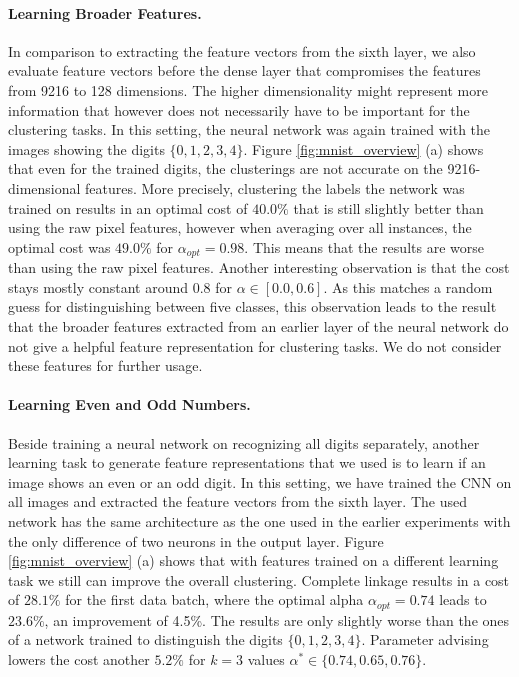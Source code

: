 \paragraph{Learning Broader Features.} In comparison to extracting the feature vectors from the sixth layer, we also evaluate feature vectors before the dense layer that compromises the features from 9216 to 128 dimensions. The higher dimensionality might represent more information that however does not necessarily have to be important for the clustering tasks. In this setting, the neural network was again trained with the images showing the digits $\{0,1,2,3,4\}$. Figure \ref{fig:mnist_overview} (a) shows that even for the trained digits, the clusterings are not accurate on the 9216-dimensional features. More precisely, clustering the labels the network was trained on results in an optimal cost of $40.0\%$ that is still slightly better than using the raw pixel features, however when averaging over all instances, the optimal cost was $49.0\%$ for $\alpha_{opt} = 0.98$. This means that the results are worse than using the raw pixel features. Another interesting observation is that the cost stays mostly constant around $0.8$ for $\alpha \in [0.0,0.6]$. As this matches a random guess for distinguishing between five classes, this observation leads to the result that the broader features extracted from an earlier layer of the neural network do not give a helpful feature representation for clustering tasks. We do not consider these features for further usage.

\paragraph{Learning Even and Odd Numbers.} Beside training a neural network on recognizing all digits separately, another learning task to generate feature representations that we used is to learn if an image shows an even or an odd digit. In this setting, we have trained the CNN on all images and extracted the feature vectors from the sixth layer. The used network has the same architecture as the one used in the earlier experiments with the only difference of two neurons in the output layer. Figure \ref{fig:mnist_overview} (a) shows that with features trained on a different learning task we still can improve the overall clustering. Complete linkage results in a cost of $28.1\%$ for the first data batch, where the optimal alpha $\alpha_{opt} = 0.74$ leads to $23.6\%$, an improvement of 4.5\%. The results are only slightly worse than the ones of a network trained to distinguish the digits $\{0,1,2,3,4\}$. Parameter advising lowers the cost another $5.2\%$ for $k = 3$ values $\alpha^* \in \{0.74, 0.65, 0.76\}$.\\

